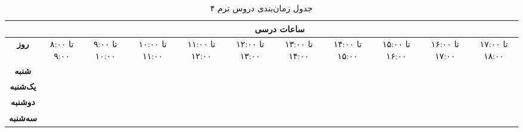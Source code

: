 \documentclass{article}
\begin{document}
	
	\begin{sidewaystable}[h]
		\begin{center}	
			\caption{جدول زمان‌بندی دروس ترم ۴}	
			\begin{tabular}{|c|c|c|c|c|c|c|c|c|c|c|}
				\cline{2-11}
				\multicolumn{1}{c}{}
				& \multicolumn{10}{|c|}{\textbf{ساعات درسی}} \\ \hline
                \textbf{روز} & 
                ۸:۰۰ تا ۹:۰۰ & 
                ۹:۰۰ تا ۱۰:۰۰ & 
                ۱۰:۰۰ تا ۱۱:۰۰ & 
                ۱۱:۰۰ تا ۱۲:۰۰ & 
                ۱۲:۰۰ تا ۱۳:۰۰ & 
                ۱۳:۰۰ تا ۱۴:۰۰ &
                ۱۴:۰۰ تا ۱۵:۰۰ & 
                ۱۵:۰۰ تا ۱۶:۰۰ & 
                ۱۶:۰۰ تا ۱۷:۰۰ & 
                ۱۷:۰۰ تا ۱۸:۰۰ \\
				\hline
                \hline
				
				\multirow{5}{*}{\textbf{شنبه}}
				& & & & & & & & & & \\
				\cline{2-11}
				& & & & & & & & & & \\
				\cline{2-11}				
				& & & & & & & & & & \\
				\cline{2-11}
				& & & & & & & & & & \\
				\cline{2-11}				
				& & & & & & & & & & \\
				\hline \hline
				
								\multirow{5}{*}{\textbf{یک‌شنبه}}
				& & & & & & & & & & \\
				\cline{2-11}
				& & & & & & & & & & \\
				\cline{2-11}				
				& & & & & & & & & & \\
				\cline{2-11}
				& & & & & & & & & & \\
				\cline{2-11}				
				& & & & & & & & & & \\
				\hline \hline
				
								\multirow{5}{*}{\textbf{دوشنبه}}
				& & & & & & & & & & \\
				\cline{2-11}
				& & & & & & & & & & \\
				\cline{2-11}				
				& & & & & & & & & & \\
				\cline{2-11}
				& & & & & & & & & & \\
				\cline{2-11}				
				& & & & & & & & & & \\
				\hline \hline
				
								\multirow{5}{*}{\textbf{سه‌شنبه}}
				& & & & & & & & & & \\
				\cline{2-11}
				& & & & & & & & & & \\
				\cline{2-11}				
				& & & & & & & & & & \\
				\cline{2-11}
				& & & & & & & & & & \\
				\cline{2-11}				
				& & & & & & & & & & \\
				\hline \hline
				

\end{tabular}
\end{center}
\end{sidewaystable}
\end{document}
